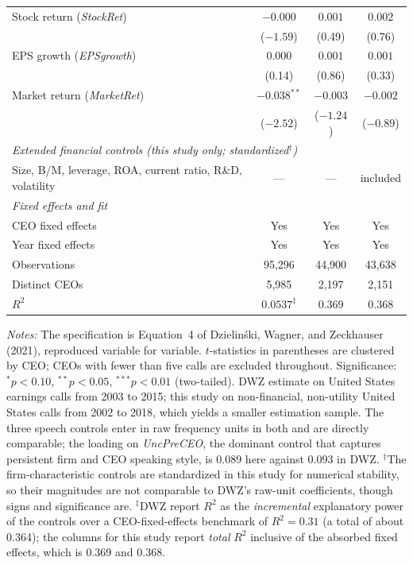 \begin{table}[htbp]
\begin{tabular}{lccc}
Stock return (\textit{StockRet}) & $-0.000$ & $0.001$ & $0.002$ \\
 & ($-1.59$) & (0.49) & (0.76) \\
EPS growth (\textit{EPSgrowth}) & $0.000$ & $0.001$ & $0.001$ \\
 & (0.14) & (0.86) & (0.33) \\
Market return (\textit{MarketRet}) & $-0.038^{**}$ & $-0.003$ & $-0.002$ \\
 & ($-2.52$) & ($-1.24$) & ($-0.89$) \\
\midrule
\multicolumn{4}{l}{\textit{Extended financial controls (this study only; standardized$^{\dagger}$)}} \\
\midrule
Size, B/M, leverage, ROA, current ratio, R\&D, volatility & --- & --- & included \\
\midrule
\multicolumn{4}{l}{\textit{Fixed effects and fit}} \\
\midrule
CEO fixed effects & Yes & Yes & Yes \\
Year fixed effects & Yes & Yes & Yes \\
Observations & 95,296 & 44,900 & 43,638 \\
Distinct CEOs & 5,985 & 2,197 & 2,151 \\
$R^2$ & $0.0537^{\ddagger}$ & 0.369 & 0.368 \\
\bottomrule
\end{tabular}
\begin{minipage}{0.96\linewidth}
\vspace{4pt}\footnotesize
\textit{Notes:} The specification is Equation~4 of Dzielin\'ski, Wagner, and Zeckhauser (2021), reproduced variable for variable. $t$-statistics in parentheses are clustered by CEO; CEOs with fewer than five calls are excluded throughout. Significance: $^{*}p<0.10$, $^{**}p<0.05$, $^{***}p<0.01$ (two-tailed). DWZ estimate on United States earnings calls from 2003 to 2015; this study on non-financial, non-utility United States calls from 2002 to 2018, which yields a smaller estimation sample. The three speech controls enter in raw frequency units in both and are directly comparable; the loading on \textit{UncPreCEO}, the dominant control that captures persistent firm and CEO speaking style, is 0.089 here against 0.093 in DWZ. $^{\dagger}$The firm-characteristic controls are standardized in this study for numerical stability, so their magnitudes are not comparable to DWZ's raw-unit coefficients, though signs and significance are. $^{\ddagger}$DWZ report $R^2$ as the \textit{incremental} explanatory power of the controls over a CEO-fixed-effects benchmark of $R^2=0.31$ (a total of about 0.364); the columns for this study report \textit{total} $R^2$ inclusive of the absorbed fixed effects, which is 0.369 and 0.368.
\end{minipage}
\end{table}
